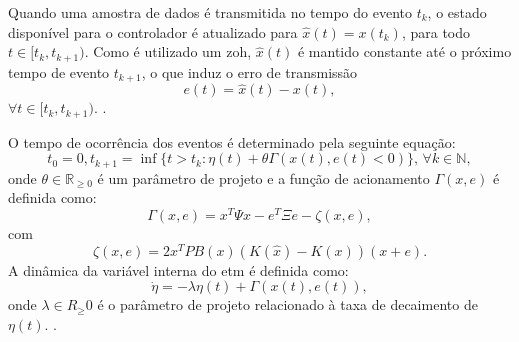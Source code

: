 Quando uma amostra de dados é transmitida no tempo do evento $t_k$, o estado disponível para o controlador é atualizado para $\hat{x}(t) = x(t_k)$, para todo $t \in [t_k, t_{k+1})$. Como é utilizado um \acrshort{zoh}, $\hat{x}(t)$ é mantido constante até o próximo tempo de evento $t_{k+1}$, o que induz o erro de transmissão \begin{equation}e(t) = \hat{x}(t) - x(t) \label{eq:etm-error},\end{equation} $\forall t \in [t_k, t_{k+1})$. \cite{coutinho2021}.

O tempo de ocorrência dos eventos é determinado pela seguinte equação: \begin{equation} t_0 = 0, t_{k+1} = \inf \{t > t_k : \eta(t) + \theta \Gamma(x(t), e(t) < 0) \}, \, \forall k \in \mathbb{N}, \label{eq:etm-dynamic-trigger}\end{equation} onde $\theta \in \mathbb{R}_{\geq 0}$ é um parâmetro de projeto e a função de acionamento $\Gamma(x, e)$ é definida como: \begin{equation} \label{eq:etm-gama} \Gamma(x, e) = x^T \Psi x - e^T \Xi e - \zeta (x,e), \end{equation} com \begin{equation} \zeta(x, e) = 2x^TPB(x)(K(\hat{x}) - K(x))(x+e). \end{equation} A dinâmica da variável interna do \acrshort{etm} é definida como: \begin{equation}  \dot{\eta} = - \lambda \eta(t) + \Gamma(x(t), e(t)), \label{eq:dynamic-etm}\end{equation} onde $\lambda \in R_{\geq} 0 $ é o parâmetro de projeto relacionado à taxa de decaimento de $\eta(t)$. \cite{coutinho2021}.


